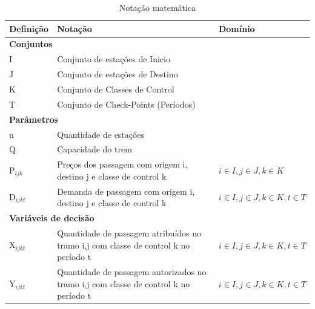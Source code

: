 \begin{table}[h]
	\centering
	\small
	\begin{tabular}{p{2cm} p{9.5cm} p{3.2cm}}
		\toprule
		\textbf{Definição} & \textbf{Notação}                                                                     & \textbf{Domínio}                     \\ \midrule
		\multicolumn{3}{l}{\textbf{Conjuntos}}                                                                                                           \\ \midrule
		I                  & Conjunto de estações de Inicio                                                       &                                      \\
		J                  & Conjunto de estações de Destino                                                      &                                      \\
		K                  & Conjunto de Classes de Control                                                       &                                      \\
		T                  & Conjunto de Check-Points (Períodos)                                                  &                                      \\ \midrule
		\multicolumn{3}{l}{\textbf{Parâmetros}}                                                                                                          \\ \midrule
		n                  & Quantidade de estações                                                               &                                      \\
		Q                  & Capacidade do trem                                                                   &                                      \\
		P$_{ijk}$          & Preços  dos passagem com origem i, destino j e classe de control k                   & $i \in I, j \in J, k \in K$          \\
		D$_{ijkt}$         & Demanda  de passagem com origem i, destino j e classe de control k                   & $i \in I, j \in J, k \in K, t \in T$ \\ \midrule
		\multicolumn{3}{l}{\textbf{Variáveis de decisão}}                                                                                                \\ \midrule
		X$_{ijkt}$         & Quantidade de passagem atribuídos no tramo i,j com classe de control k no período t  & $i \in I, j \in J, k \in K, t \in T$ \\
		Y$_{ijkt}$         & Quantidade de passagem autorizados no tramo i,j com classe de control k no período t & $i \in I, j \in J, k \in K, t \in T$ \\ \bottomrule
	\end{tabular}
	\caption{Notação matemática}
	\label{Notacao}
\end{table}


